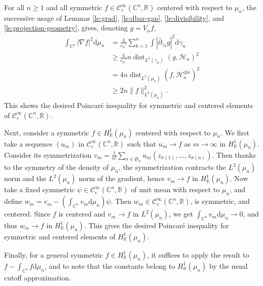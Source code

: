 \documentclass[11pt,reqno]{amsart}
\numberwithin{equation}{section}%
\numberwithin{figure}{section}%
\numberwithin{table}{section}
\theoremstyle{plain}
\theoremstyle{definition}
\begin{document}
For all $n\geq1$ and all symmetric
$f\in\mathcal{C}^\infty_c(\mathbb{C}^n,\mathbb{R})$ centered with respect to
$\mu_n$, the successive usage of Lemmas \ref{le:grad}, \ref{le:dbar-gap},
\ref{le:divisibility}, and \ref{le:projection-geometry}, gives, denoting
$g=V_nf$,
\begin{align}
  \int_{\mathbb{C}^n}|\nabla f|^2\mathrm{d}\mu_n
  &=\frac{4}{c_n'}\sum_{k=1}^n\int|\bar\partial_{z_k}g|^2\mathrm{d}\gamma_n\\
  &\geq\frac{4}{c_n'}n\operatorname{dist}_{L^2(\gamma_n)}(g,\mathcal{H}_n)^2\label{eq:dbar-gap:inline}\\
  &=4n\operatorname{dist}_{L^2(\mu_n)}(f,\mathcal{H}_n^{\mathrm{div}})^2 \\
  &\geq 2n\|f\|_{L^2(\mu_n)}^2\label{eq:half-distance:inline}.
\end{align}
This shows the desired Poincaré inequality for symmetric and centered elements of
$\mathcal{C}^\infty_c(\mathbb{C}^n,\mathbb{R})$.

Next, consider a symmetric $f\in H^1_{\mathbb{R}}(\mu_n)$ centered with
respect to $\mu_n$. We first take a sequence $(u_m)$ in
$\mathcal{C}^\infty_c(\mathbb{C}^n,\mathbb{R})$ such that $u_m\to f$ as
$m\to\infty$ in $H^1_{\mathbb{R}}(\mu_n)$. Consider its symmetrization
$v_m=\frac{1}{n!}\sum_{\sigma\in\mathfrak{S}_n}u_m(z_{\sigma(1)},\ldots,z_{\sigma(n)})$.
Then thanks to the symmetry of the density of $\mu_n$, the symmetrization
contracts the $L^2(\mu_n)$ norm and the $L^2(\mu_n)$ norm of the gradient,
hence $v_m\to f$ in $H^1_{\mathbb{R}}(\mu_n)$. Now take a fixed symmetric
$\psi\in\mathcal{C}^\infty_c(\mathbb{C}^n,\mathbb{R})$ of unit mean with
respect to $\mu_n$, and define
$w_m=v_m-(\int_{\mathbb{C}^n}v_m\mathrm{d}\mu_n)\psi$. Then
$w_m\in\mathcal{C}^\infty_c(\mathbb{C}^n,\mathbb{R})$, is symmetric, and
centered. Since $f$ is centered and $v_m\to f$ in $L^2(\mu_n)$, we get
$\int_{\mathbb{C}^n}v_m\mathrm{d}\mu_n\to0$, and thus $w_m\to f$ in
$H^1_{\mathbb{R}}(\mu_n)$. This gives the desired Poincaré inequality for
symmetric and centered elements of $H^1_{\mathbb{R}}(\mu_n)$.

Finally, for a general symmetric $f\in H^1_{\mathbb{R}}(\mu_n)$, it suffices
to apply the result to $f-\int_{\mathbb{C}^n}f\mathrm{d}\mu_n$, and to note
that the constants belong to $H^1_{\mathbb{R}}(\mu_n)$ by the usual cutoff
approximation.

\end{document}
